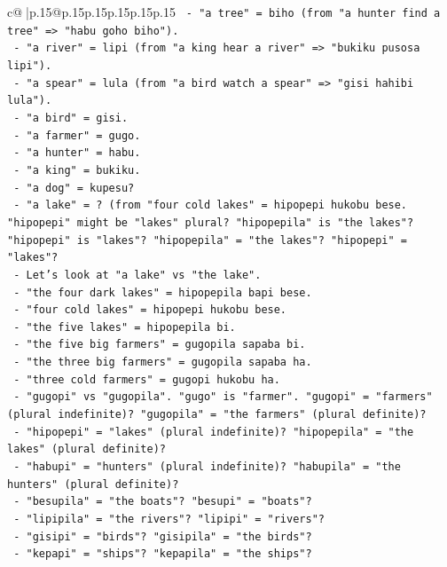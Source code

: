 \documentclass{article}
\begin{document}
{\begin{supertabular}{c@{$\;$}|p{.15\linewidth}@{}p{.15\linewidth}p{.15\linewidth}p{.15\linewidth}p{.15\linewidth}p{.15\linewidth}}
{{{\texttt{  {-} "a tree" = biho (from "a hunter find a tree" => "habu goho biho").} \\
\texttt{  {-} "a river" = lipi (from "a king hear a river" => "bukiku pusosa lipi").} \\
\texttt{  {-} "a spear" = lula (from "a bird watch a spear" => "gisi hahibi lula").} \\
\texttt{  {-} "a bird" = gisi.} \\
\texttt{  {-} "a farmer" = gugo.} \\
\texttt{  {-} "a hunter" = habu.} \\
\texttt{  {-} "a king" = bukiku.} \\
\texttt{  {-} "a dog" = kupesu?} \\
\texttt{  {-} "a lake" = ? (from "four cold lakes" = hipopepi hukobu bese. "hipopepi" might be "lakes" plural? "hipopepila" is "the lakes"? "hipopepi" is "lakes"? "hipopepila" = "the lakes"? "hipopepi" = "lakes"?} \\
\texttt{  {-} Let's look at "a lake" vs "the lake".} \\
\texttt{  {-} "the four dark lakes" = hipopepila bapi bese.} \\
\texttt{  {-} "four cold lakes" = hipopepi hukobu bese.} \\
\texttt{  {-} "the five lakes" = hipopepila bi.} \\
\texttt{  {-} "the five big farmers" = gugopila sapaba bi.} \\
\texttt{  {-} "the three big farmers" = gugopila sapaba ha.} \\
\texttt{  {-} "three cold farmers" = gugopi hukobu ha.} \\
\texttt{  {-} "gugopi" vs "gugopila". "gugo" is "farmer". "gugopi" = "farmers" (plural indefinite)? "gugopila" = "the farmers" (plural definite)?} \\
\texttt{  {-} "hipopepi" = "lakes" (plural indefinite)? "hipopepila" = "the lakes" (plural definite)?} \\
\texttt{  {-} "habupi" = "hunters" (plural indefinite)? "habupila" = "the hunters" (plural definite)?} \\
\texttt{  {-} "besupila" = "the boats"? "besupi" = "boats"?} \\
\texttt{  {-} "lipipila" = "the rivers"? "lipipi" = "rivers"?} \\
\texttt{  {-} "gisipi" = "birds"? "gisipila" = "the birds"?} \\
\texttt{  {-} "kepapi" = "ships"? "kepapila" = "the ships"?} \\
}}}
\end{supertabular}}
\end{document}
